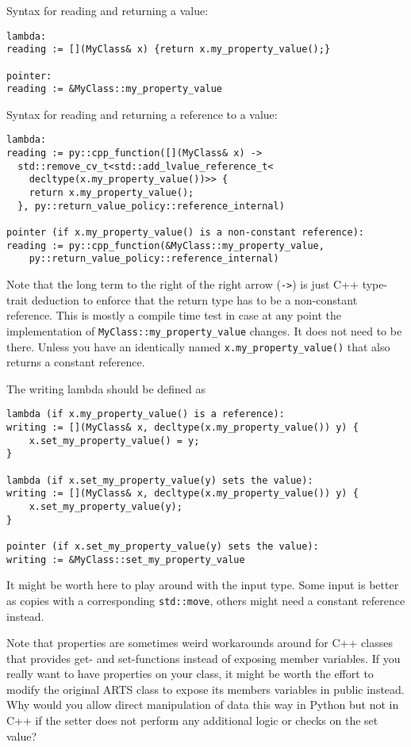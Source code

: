Syntax for reading and returning a value:
\begin{verbatim}
lambda:
reading := [](MyClass& x) {return x.my_property_value();}

pointer:
reading := &MyClass::my_property_value
\end{verbatim}

Syntax for reading and returning a reference to a value:
\begin{verbatim}
lambda:
reading := py::cpp_function([](MyClass& x) -> 
  std::remove_cv_t<std::add_lvalue_reference_t<
  	decltype(x.my_property_value())>> {
    return x.my_property_value();
  }, py::return_value_policy::reference_internal)

pointer (if x.my_property_value() is a non-constant reference):
reading := py::cpp_function(&MyClass::my_property_value,
    py::return_value_policy::reference_internal)
\end{verbatim}
Note that the long term to the right of the right arrow (\verb|->|) is just C++ type-trait deduction to
enforce that the return type has to be a non-constant reference.  This is mostly
a compile time test in case at any point the implementation of \verb|MyClass::my_property_value|
changes.  It does not need to be there.  Unless you have an identically named \verb|x.my_property_value()|
that also returns a constant reference.

The writing lambda should be defined as
\begin{verbatim}
lambda (if x.my_property_value() is a reference):
writing := [](MyClass& x, decltype(x.my_property_value()) y) {
    x.set_my_property_value() = y;
}

lambda (if x.set_my_property_value(y) sets the value):
writing := [](MyClass& x, decltype(x.my_property_value()) y) {
    x.set_my_property_value(y);
}

pointer (if x.set_my_property_value(y) sets the value):
writing := &MyClass::set_my_property_value
\end{verbatim}
It might be worth here to play around with the input type.  Some input
is better as copies with a corresponding \verb|std::move|, others might need
a constant reference instead.

Note that properties are sometimes weird workarounds around for C++ classes that provides get- and set-functions
instead of exposing member variables.  If you really want to have properties on your class, it might be worth
the effort to modify the original ARTS class to expose its members variables in public instead.  Why would you
allow direct manipulation of data this way in Python but not in C++ if the setter does not perform any additional
logic or checks on the set value?

